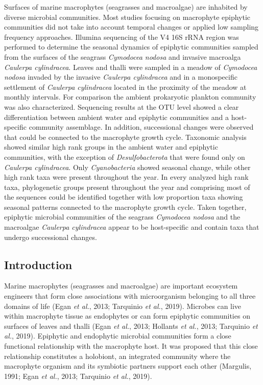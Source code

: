 \documentclass[12pt,]{article}
\begin{document}
Surfaces of marine macrophytes (seagrasses and macroalgae) are inhabited
by diverse microbial communities. Most studies focusing on macrophyte
epiphytic communities did not take into account temporal changes or
applied low sampling frequency approaches. Illumina sequencing of the V4
16S rRNA region was performed to determine the seasonal dynamics of
epiphytic communities sampled from the surfaces of the seagrass
\emph{Cymodocea nodosa} and invasive macroalga \emph{Caulerpa
cylindracea}. Leaves and thalli were sampled in a meadow of
\emph{Cymodocea nodosa} invaded by the invasive \emph{Caulerpa
cylindracea} and in a monospecific settlement of \emph{Caulerpa
cylindracea} located in the proximity of the meadow at monthly
intervals. For comparison the ambient prokaryotic plankton community was
also characterized. Sequencing results at the OTU level showed a clear
differentiation between ambient water and epiphytic communities and a
host-specific community assemblage. In addition, successional changes
were observed that could be connected to the macrophyte growth cycle.
Taxonomic analysis showed similar high rank groups in the ambient water
and epiphytic communities, with the exception of \emph{Desulfobacterota}
that were found only on \emph{Caulerpa cylindracea}. Only
\emph{Cyanobacteria} showed seasonal change, while other high rank taxa
were present throughout the year. In every analyzed high rank taxa,
phylogenetic groups present throughout the year and comprising most of
the sequences could be identified together with low proportion taxa
showing seasonal patterns connected to the macrophyte growth cycle.
Taken together, epiphytic microbial communities of the seagrass
\emph{Cymodocea nodosa} and the macroalgae \emph{Caulerpa cylindracea}
appear to be host-specific and contain taxa that undergo successional
changes.

\newpage

\hypertarget{introduction}{%
\subsection{Introduction}\label{introduction}}

Marine macrophytes (seagrasses and macroalgae) are important ecosystem
engineers that form close associations with microorganism belonging to
all three domains of life (Egan \emph{et al.}, 2013; Tarquinio \emph{et
al.}, 2019). Microbes can live within macrophyte tissue as endophytes or
can form epiphytic communities on surfaces of leaves and thalli (Egan
\emph{et al.}, 2013; Hollants \emph{et al.}, 2013; Tarquinio \emph{et
al.}, 2019). Epiphytic and endophytic microbial communities form a close
functional relationship with the macrophyte host. It was proposed that
this close relationship constitutes a holobiont, an integrated community
where the macrophyte organism and its symbiotic partners support each
other (Margulis, 1991; Egan \emph{et al.}, 2013; Tarquinio \emph{et
al.}, 2019).
\end{document}
